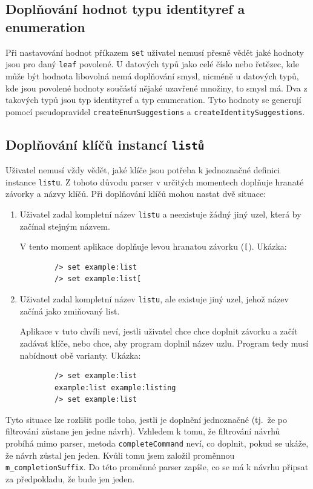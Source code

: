 \documentclass[thesis=B,czech,hidelinks]{FITthesis}[2019/03/06]
\begin{document}
\subsection{Doplňování hodnot typu identityref a enumeration}
Při nastavování hodnot příkazem \texttt{set} uživatel nemusí přesně vědět jaké hodnoty jsou pro daný \texttt{leaf} povolené. U datových typů jako celé číslo nebo řetězec, kde může být hodnota libovolná nemá doplňování smysl, nicméně u datových typů, kde jsou povolené hodnoty součástí nějaké uzavřené množiny, to smysl má. Dva z takových typů jsou typ identityref a typ enumeration. Tyto hodnoty se generují pomocí pseudopravidel \texttt{createEnumSuggestions} a \texttt{createIdentitySuggestions}.


\subsection{Doplňování klíčů instancí \texttt{listů}}
Uživatel nemusí vždy vědět, jaké klíče jsou potřeba k jednoznačné definici instance \texttt{listu}. Z tohoto důvodu parser v určitých momentech doplňuje hranaté závorky a názvy klíčů. Při doplňování klíčů mohou nastat dvě situace:

\begin{enumerate}
    \item Uživatel zadal kompletní název \texttt{listu} a neexistuje žádný jiný uzel, která by začínal stejným názvem.

        V tento moment aplikace doplňuje levou hranatou závorku (\verb¨[¨). Ukázka:
        \begin{verbatim}
        /> set example:list
        /> set example:list[
        \end{verbatim}

    \item Uživatel zadal kompletní název \texttt{listu}, ale existuje jiný uzel, jehož název začíná jako zmiňovaný list.

        Aplikace v tuto chvíli neví, jestli uživatel chce chce doplnit závorku a začít zadávat klíče, nebo chce, aby program doplnil název uzlu. Program tedy musí nabídnout obě varianty. Ukázka:
        \begin{verbatim}
        /> set example:list
        example:list example:listing
        /> set example:list
        \end{verbatim}

\end{enumerate}
Tyto situace lze rozlišit podle toho, jestli je doplnění jednoznačné (tj.\ že po filtrování zůstane jen jedne návrh). Vzhledem k tomu, že filtrování návrhů probíhá mimo parser, metoda \texttt{completeCommand} neví, co doplnit, pokud se ukáže, že návrh zůstal jen jeden. Kvůli tomu jsem založil proměnnou \texttt{m\_completionSuffix}. Do této proměnné parser zapíše, co se má k návrhu připsat za předpokladu, že bude jen jeden.
\end{document}
